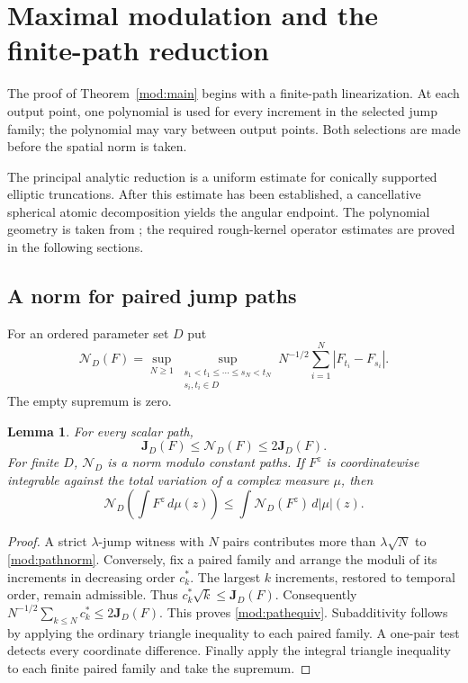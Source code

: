 \documentclass[11pt]{article}
\numberwithin{equation}{section}
\newtheorem{lemma}[theorem]{Lemma}
\theoremstyle{remark}
\theoremstyle{definition}
\newcommand{\NN}{\mathcal N}
\begin{document}
\section{Maximal modulation and the finite-path reduction}\label{mod:sec-reduction}
The proof of Theorem~\ref{mod:main} begins with a finite-path
linearization. At each output point, one polynomial is used for every
increment in the selected jump family; the polynomial may vary between
output points. Both selections are made before the spatial norm is taken.

The principal analytic reduction is a uniform estimate for conically
supported elliptic truncations. After this estimate has been established,
a cancellative spherical atomic decomposition yields the angular endpoint.
The polynomial geometry is taken from \cite{BDJST}; the required
rough-kernel operator estimates are proved in the following sections.

\subsection{A norm for paired jump paths}
For an ordered parameter set $D$ put
\begin{equation}\label{mod:pathnorm}
 \NN_D(F)=\sup_{N\ge1}\sup_{\substack{s_1<t_1\le\cdots\le s_N<t_N\\s_i,t_i\in D}}
 N^{-1/2}\sum_{i=1}^N|F_{t_i}-F_{s_i}|.
\end{equation}
The empty supremum is zero.
\begin{lemma}\label{mod:pathlemma}
For every scalar path,
\begin{equation}\label{mod:pathequiv}
 \mathbf J_D(F)\le\NN_D(F)\le2\mathbf J_D(F).
\end{equation}
For finite $D$, $\NN_D$ is a norm modulo constant paths. If $F^z$ is
coordinatewise integrable against the total variation of a complex
measure $\mu$, then
\begin{equation}\label{mod:pathintegral}
 \NN_D\left(\int F^z\,d\mu(z)\right)
 \le\int\NN_D(F^z)\,d|\mu|(z).
\end{equation}
\end{lemma}
\begin{proof}
A strict $\lambda$-jump witness with $N$ pairs contributes more than
$\lambda\sqrt N$ to \eqref{mod:pathnorm}. Conversely, fix a paired family
and arrange the moduli of its increments in decreasing order $c_k^*$.
The largest $k$ increments, restored to temporal order, remain admissible.
Thus $c_k^*\sqrt{k}\le\mathbf J_D(F)$. Consequently
$N^{-1/2}\sum_{k\le N}c_k^*\le2\mathbf J_D(F)$. This proves
\eqref{mod:pathequiv}. Subadditivity follows by applying the ordinary
triangle inequality to each paired family. A one-pair test detects every
coordinate difference. Finally apply the integral triangle inequality to
each finite paired family and take the supremum.
\end{proof}
\end{document}
